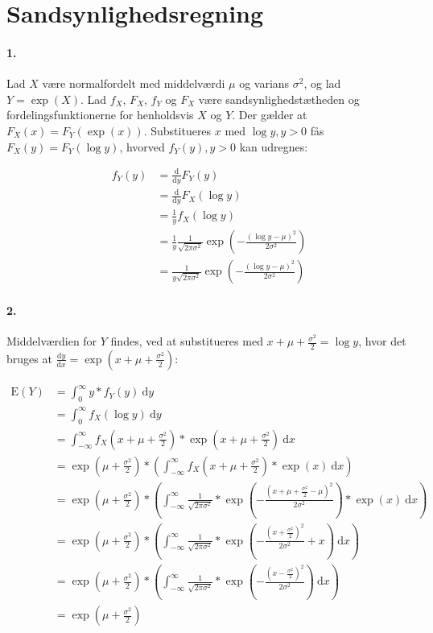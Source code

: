 \section{Sandsynlighedsregning}
\newcommand{\diff}{\mathrm{d}}

\paragraph{1.} Lad $X$ være normalfordelt med middelværdi $\mu$ og varians
$\sigma^2$, og lad $Y=\exp(X)$. Lad $f_X$, $F_X$, $f_Y$ og $F_X$
være sandsynlighedstætheden og fordelingsfunktionerne for henholdsvis $X$ og
$Y$. Der gælder at $F_X(x) = F_Y(\exp(x))$. Substitueres $x$ med $\log
y, y > 0$ fås $F_X(y) = F_Y(\log y)$, hvorved $f_Y(y), y > 0$ kan udregnes:

\begin{align*}
f_Y(y) &= \frac{\diff}{\diff y} F_Y(y) \\
&= \frac{\diff}{\diff y} F_X(\log y) \\
&= \frac{1}{y} f_X(\log y) \\
&= \frac{1}{y} \frac{1}{\sqrt{2\pi\sigma^2}}\exp\left( -\frac{(\log y - \mu)^2}{2\sigma^2} \right) \\ 
&= \frac{1}{y\sqrt{2\pi\sigma^2}}\exp\left( -\frac{(\log y - \mu)^2}{2\sigma^2} \right) 
\end{align*}


\paragraph{2.} Middelværdien for $Y$ findes, ved at substitueres med $x +
\mu + \frac{\sigma^2}{2} = \log y$, hvor det bruges at $\frac{\diff y}{\diff
x} = \exp(x + \mu + \frac{\sigma^2}{2})$:

\begin{align*}
\mathrm{E}(Y)
&= \int_0^\infty y*f_Y(y)\ \diff y \\
&= \int_0^\infty f_X(\log y)\ \diff y \\
&= \int_{-\infty}^\infty
     f_X\left(x + \mu + \frac{\sigma^2}{2}\right) *
     \exp\left(x + \mu + \frac{\sigma^2}{2}\right)
   \ \diff x \\
&= \exp\left(\mu + \frac{\sigma^2}{2}\right) * \left(\int_{-\infty}^\infty
     f_X\left(x + \mu + \frac{\sigma^2}{2}\right) *
     \exp(x)
   \ \diff x\right) \\
&= \exp\left(\mu + \frac{\sigma^2}{2}\right) * \left(\int_{-\infty}^\infty
     \frac{1}{\sqrt{2\pi\sigma^2}} *
     \exp\left(-\frac{(x + \mu + \frac{\sigma^2}{2} - \mu)^2}{2\sigma^2}\right) *
     \exp(x)
   \ \diff x\right) \\
&= \exp\left(\mu + \frac{\sigma^2}{2}\right) * \left(\int_{-\infty}^\infty
     \frac{1}{\sqrt{2\pi\sigma^2}} *
     \exp\left(-\frac{(x + \frac{\sigma^2}{2})^2}{2\sigma^2} + x\right)
   \ \diff x\right) \\
&= \exp\left(\mu + \frac{\sigma^2}{2}\right) * \left(\int_{-\infty}^\infty
     \frac{1}{\sqrt{2\pi\sigma^2}} *
     \exp\left(-\frac{(x - \frac{\sigma^2}{2})^2}{2\sigma^2}\right)
   \ \diff x\right) \\
&= \exp\left(\mu + \frac{\sigma^2}{2}\right) \\
\end{align*}

